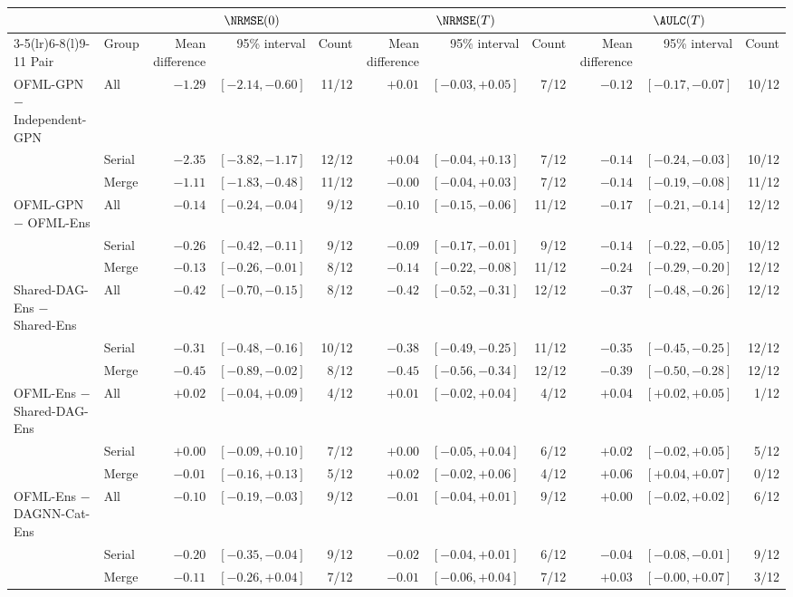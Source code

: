 \begin{tabular}{@{}ll rrr rrr rrr@{}}
\toprule
 & & \multicolumn{3}{c}{$\NRMSE(0)$} & \multicolumn{3}{c}{$\NRMSE(T)$} & \multicolumn{3}{c}{$\AULC(T)$}\\
\cmidrule(lr){3-5}\cmidrule(lr){6-8}\cmidrule(l){9-11}
Pair & Group & Mean difference & 95\% interval & Count & Mean difference & 95\% interval & Count & Mean difference & 95\% interval & Count\\
\midrule
OFML-GPN $-$ Independent-GPN & All & $-1.29$ & $[-2.14,-0.60]$ & 11/12 & $+0.01$ & $[-0.03,+0.05]$ & 7/12 & $-0.12$ & $[-0.17,-0.07]$ & 10/12 \\
 & Serial & $-2.35$ & $[-3.82,-1.17]$ & 12/12 & $+0.04$ & $[-0.04,+0.13]$ & 7/12 & $-0.14$ & $[-0.24,-0.03]$ & 10/12 \\
 & Merge & $-1.11$ & $[-1.83,-0.48]$ & 11/12 & $-0.00$ & $[-0.04,+0.03]$ & 7/12 & $-0.14$ & $[-0.19,-0.08]$ & 11/12 \\
\addlinespace
OFML-GPN $-$ OFML-Ens & All & $-0.14$ & $[-0.24,-0.04]$ & 9/12 & $-0.10$ & $[-0.15,-0.06]$ & 11/12 & $-0.17$ & $[-0.21,-0.14]$ & 12/12 \\
 & Serial & $-0.26$ & $[-0.42,-0.11]$ & 9/12 & $-0.09$ & $[-0.17,-0.01]$ & 9/12 & $-0.14$ & $[-0.22,-0.05]$ & 10/12 \\
 & Merge & $-0.13$ & $[-0.26,-0.01]$ & 8/12 & $-0.14$ & $[-0.22,-0.08]$ & 11/12 & $-0.24$ & $[-0.29,-0.20]$ & 12/12 \\
\addlinespace
Shared-DAG-Ens $-$ Shared-Ens & All & $-0.42$ & $[-0.70,-0.15]$ & 8/12 & $-0.42$ & $[-0.52,-0.31]$ & 12/12 & $-0.37$ & $[-0.48,-0.26]$ & 12/12 \\
 & Serial & $-0.31$ & $[-0.48,-0.16]$ & 10/12 & $-0.38$ & $[-0.49,-0.25]$ & 11/12 & $-0.35$ & $[-0.45,-0.25]$ & 12/12 \\
 & Merge & $-0.45$ & $[-0.89,-0.02]$ & 8/12 & $-0.45$ & $[-0.56,-0.34]$ & 12/12 & $-0.39$ & $[-0.50,-0.28]$ & 12/12 \\
\addlinespace
OFML-Ens $-$ Shared-DAG-Ens & All & $+0.02$ & $[-0.04,+0.09]$ & 4/12 & $+0.01$ & $[-0.02,+0.04]$ & 4/12 & $+0.04$ & $[+0.02,+0.05]$ & 1/12 \\
 & Serial & $+0.00$ & $[-0.09,+0.10]$ & 7/12 & $+0.00$ & $[-0.05,+0.04]$ & 6/12 & $+0.02$ & $[-0.02,+0.05]$ & 5/12 \\
 & Merge & $-0.01$ & $[-0.16,+0.13]$ & 5/12 & $+0.02$ & $[-0.02,+0.06]$ & 4/12 & $+0.06$ & $[+0.04,+0.07]$ & 0/12 \\
\addlinespace
OFML-Ens $-$ DAGNN-Cat-Ens & All & $-0.10$ & $[-0.19,-0.03]$ & 9/12 & $-0.01$ & $[-0.04,+0.01]$ & 9/12 & $+0.00$ & $[-0.02,+0.02]$ & 6/12 \\
 & Serial & $-0.20$ & $[-0.35,-0.04]$ & 9/12 & $-0.02$ & $[-0.04,+0.01]$ & 6/12 & $-0.04$ & $[-0.08,-0.01]$ & 9/12 \\
 & Merge & $-0.11$ & $[-0.26,+0.04]$ & 7/12 & $-0.01$ & $[-0.06,+0.04]$ & 7/12 & $+0.03$ & $[-0.00,+0.07]$ & 3/12 \\
\bottomrule
\end{tabular}
